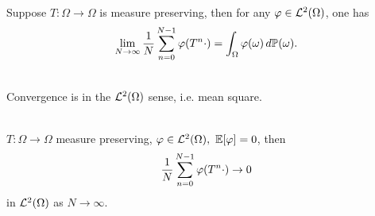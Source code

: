 \vspace{6pt}
\begin{theorem} \label{VN ergodic}\ \\
Suppose $T: \Omega \to \Omega$ is measure preserving, then for any $\varphi \in \mathcal{L}^2(\Omega)$, one has 
\begin{equation*}
    \lim_{N \to \infty} \frac{1}{N} \sum\limits_{n=0}^{N-1} \varphi(T^n \cdot) = \int_\Omega \varphi(\omega) \,d\mathbb{P}(\omega).
\end{equation*}
\end{theorem}
\begin{remark}\ \\
Convergence is in the $\mathcal{L}^2(\Omega)$ sense, i.e. mean square.
\end{remark}

\begin{proposition}\ \\
$T: \Omega \to \Omega$ measure preserving, $\vphi \in \Ls^2(\Omega),\ \E[\vphi] = 0$, then
\begin{equation*}
    \frac{1}{N} \sum\limits_{n = 0}^{N - 1} \varphi(T^n \cdot) \to 0
\end{equation*}
in $\mathcal{L}^2(\Omega)$ as $N \to \infty$. 
\end{proposition}
